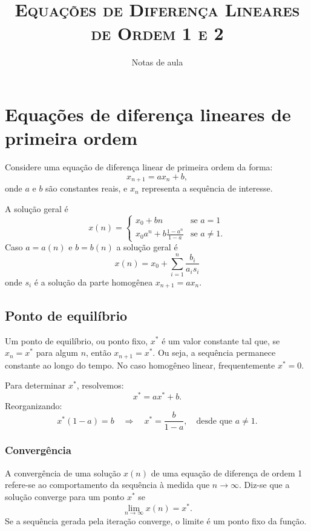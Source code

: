 \documentclass{article}
\title{\textsc{Equações de Diferença Lineares de Ordem 1 e 2}} \author{Notas de aula} \date{}
\begin{document}
\maketitle

\tableofcontents

\section{Equações de diferença lineares de primeira ordem}

Considere uma equação de diferença linear de primeira ordem da forma:
\begin{equation}
x_{n+1} = a x_n + b,
\end{equation}
onde $a$ e $b$ são constantes reais, e $x_n$ representa a sequência de interesse.

A solução geral é
\[
   x(n) =
   \begin{cases}
     x_0 + bn & \text{se } a=1\\
     x_0a^n+  b\frac{1-a^n}{1-a} & \text{se } a\neq1 .
   \end{cases}
\]
Caso $a=a(n)$ e $b=b(n)$ a 
solução geral é
\[
  x(n) =
  x_0 + \sum_{i=1}^n \frac{b_i}{a_is_i}
\]
onde $s_i$ é a solução da parte homogênea $x_{n+1} = a x_n$.
\subsection{Ponto de equilíbrio}

Um ponto de equilíbrio, ou ponto fixo, $x^*$ é um valor constante tal
que, se $x_n = x^*$ para algum $n$, então $x_{n+1} = x^*$. Ou seja, a
sequência permanece constante ao longo do tempo.  No caso homogêneo
linear, frequentemente $x^* = 0$.

Para determinar $x^*$, resolvemos:
\begin{equation}
x^* = a x^* + b.
\end{equation}
Reorganizando:
\begin{equation}
x^*(1 - a) = b \quad \Rightarrow \quad x^* = \frac{b}{1 - a}, \quad \text{desde que } a \neq 1.
\end{equation}


\subsubsection{Convergência}

A convergência de uma solução $x(n)$ de uma equação de diferença de
ordem 1 refere-se ao comportamento da sequência à medida que
$n \to \infty$. Diz-se que a solução converge para um ponto $x^*$ se
\[
\lim_{n \to \infty} x(n) = x^*.
\]
Se a sequência gerada pela iteração converge, o limite é um ponto fixo
da função.
\end{document}
